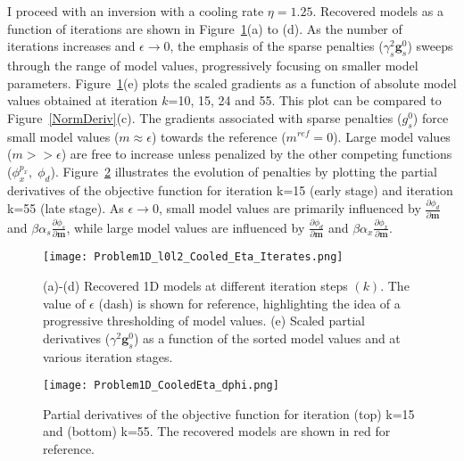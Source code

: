 I proceed with an inversion with a cooling rate $\eta=1.25$. Recovered models as a function of iterations are shown in Figure~\ref{Mixed1DIterates}(a) to (d).
As the number of iterations increases and $\epsilon \rightarrow 0$, the emphasis of the sparse penalties ($\gamma_s^2 \mathbf{g}_s^0$) sweeps through the range of model values, progressively focusing on smaller model parameters. Figure~\ref{Mixed1DIterates}(e) plots the scaled gradients as a function of absolute model values obtained at iteration $k$=10, 15, 24 and 55. This plot can be compared to Figure~\ref{NormDeriv}(c). The gradients associated with sparse penalties ($g^0_s$) force small model values ($m\approx \epsilon$) towards the reference ($m^{ref}=0$). Large model values ($m >> \epsilon$) are free to increase unless penalized by the other competing functions ($\phi_x^{p_x},\; \phi_d$).
Figure~\ref{Problem1D_CooledEta_dphi} illustrates the evolution of penalties by plotting the partial derivatives of the objective function for iteration k=15 (early stage) and iteration k=55 (late stage).
As $\epsilon \rightarrow 0$, small model values are primarily influenced by $\frac{\partial \phi_d}{\partial \mathbf{m}}$ and $\beta \alpha_s \frac{\partial \phi_s}{\partial \mathbf{m}}$, while large model values are influenced by $\frac{\partial \phi_d}{\partial \mathbf{m}}$ and $\beta \alpha_x \frac{\partial \phi_x}{\partial \mathbf{m}}$.
\begin{figure}
\texttt{[image: Problem1D\_l0l2\_Cooled\_Eta\_Iterates.png]}
\caption{(a)-(d) Recovered 1D models at different iteration steps $(k)$. The value of $\epsilon$ (dash) is shown for reference, highlighting the idea of a progressive thresholding of model values. (e) Scaled partial derivatives ($\gamma^2 \mathbf{g}_s^0$) as a function of the sorted model values and at various iteration stages.
}
\label{Mixed1DIterates}
\end{figure}
\begin{figure}
\texttt{[image: Problem1D\_CooledEta\_dphi.png]}
\caption{Partial derivatives of the objective function for iteration (top) k=15 and (bottom) k=55. The recovered models are shown in red for reference.
}
\label{Problem1D_CooledEta_dphi}
\end{figure}


